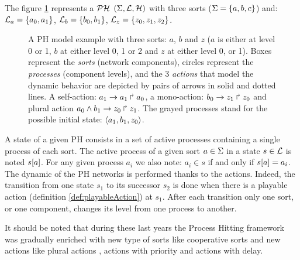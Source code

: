 \begin{example}
The figure \ref{fig:ph} represents a $\mathcal{PH}$ $(\Sigma,\mathcal{L},\mathcal{H})$ with three sorts
($\Sigma = \{a, b, c\}$) and:
$\mathcal{L}_a = \{a_0, a_1\}$,
$\mathcal{L}_b = \{b_0, b_1\}$,
$\mathcal{L}_z = \{z_0, z_1, z_2\}$.
\begin{figure}[ht]
\label{fig:ph} 
\centering
{}
\caption{
A PH model example with three sorts: $a$, $b$ and $z$ ($a$ is either at level 0 or 1, $b$ at either level 0, 1 or 2 and $z$ at either level 0, or 1). Boxes represent the \emph{sorts} (network components), circles represent the \emph{processes} (component levels), and the 3 \emph{actions} that model the dynamic behavior are depicted by pairs of arrows in solid and dotted lines. A self-action:  $a_1\rightarrow a_1\Rsh a_0$, a mono-action:  $b_0\rightarrow z_1\Rsh z_0$ and plural action  $a_0 \wedge b_1\rightarrow z_0\Rsh z_1$.  The grayed processes stand for the possible initial state: $\mbox{$\langle a_1, b_1, z_0 \rangle$}$.
}
\end{figure}
\end{example}
A state of a given PH consists in a set of active processes containing a single process of each sort.
The active process of a given sort $a \in \Sigma$ in a state $s \in \mathcal{L}$
is noted ${s[a]}$.
For any given process $a_i$ we also note: $a_i \in s$ if and only if ${s[a]} = a_i$. The dynamic of the PH networks is performed thanks to the actions. Indeed, the transition from one state $s_1$ to its successor $s_2$ is done when there is a playable action (definition \ref{def:playableAction}) at $s_1$. After each transition only one sort, or one component, changes its level from one process to another.

It should be noted that during these last years the Process Hitting framework was gradually enriched with new type of sorts like cooperative sorts and new actions like plural actions \cite{folschette-phd-14}, actions with priority \cite{FPMR13-CS2Bio} and actions with delay.


